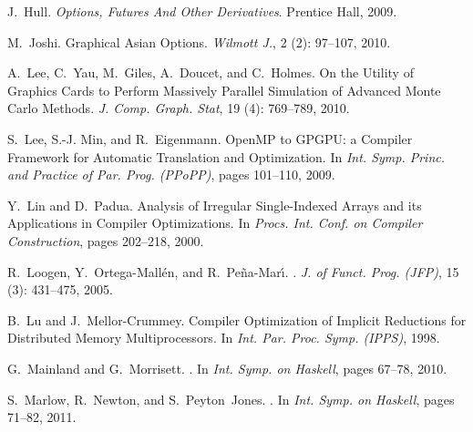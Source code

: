\documentclass{sigplanconf}  %
\begin{document}
\begin{thebibliography}{49}
J.~Hull.
\newblock \emph{Options, {F}utures {A}nd {O}ther {D}erivatives}.
\newblock Prentice Hall, 2009.

M.~Joshi.
\newblock Graphical {A}sian {O}ptions.
\newblock \emph{Wilmott J.}, 2 (2): 97--107, 2010.

A.~Lee, C.~Yau, M.~Giles, A.~Doucet, and C.~Holmes.
\newblock On the {U}tility of {G}raphics {C}ards to {P}erform {M}assively
  {P}arallel {S}imulation of {A}dvanced {M}onte {C}arlo {M}ethods.
\newblock \emph{J. Comp. Graph. Stat}, 19 (4): 769--789,
  2010.

S.~Lee, S.-J. Min, and R.~Eigenmann.
\newblock Open{MP} to {GPGPU}: a {C}ompiler {F}ramework for {A}utomatic
  {T}ranslation and {O}ptimization.
\newblock In \emph{Int. Symp. Princ. and Practice of Par. Prog. (PPoPP)}, pages
  101--110, 2009.

Y.~Lin and D.~Padua.
\newblock Analysis of {I}rregular {S}ingle-{I}ndexed {A}rrays and its
  {A}pplications in {C}ompiler {O}ptimizations.
\newblock In \emph{Procs. Int. Conf. on Compiler Construction}, pages 202--218,
  2000.

R.~Loogen, Y.~Ortega-Mall\'{e}n, and R.~{Pe\~{n}a-Mar\'{\i}}.
.
\newblock \emph{J. of Funct. Prog. (JFP)}, 15 (3): 431--475,
  2005.

B.~Lu and J.~Mellor-Crummey.
\newblock Compiler {O}ptimization of {I}mplicit {R}eductions for {D}istributed
  {M}emory {M}ultiprocessors.
\newblock In \emph{Int. Par. Proc. Symp. (IPPS)}, 1998.

G.~Mainland and G.~Morrisett.
.
\newblock In \emph{Int. Symp. on Haskell}, pages 67--78, 2010.

S.~Marlow, R.~Newton, and S.~Peyton~Jones.
.
\newblock In \emph{Int. Symp. on Haskell}, pages 71--82, 2011.


\end{thebibliography}
\end{document}
